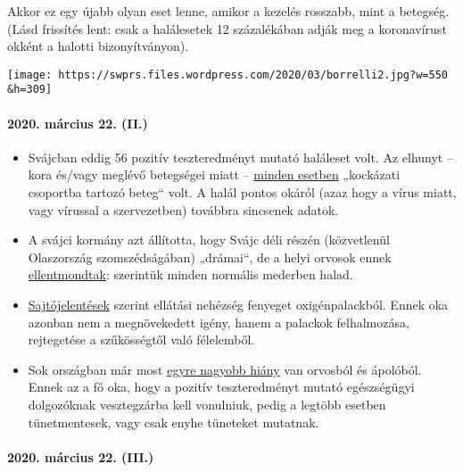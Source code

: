 Akkor ez egy újabb olyan eset lenne, amikor a kezelés rosszabb, mint a
betegség. (Lásd frissítés lent: csak a halálesetek 12 százalékában adják
meg a koronavírust okként a halotti bizonyítványon).

\texttt{[image: https://swprs.files.wordpress.com/2020/03/borrelli2.jpg?w=550\\\&h=309]}

\hypertarget{2020-muxe1rcius-22-ii}{%
\paragraph{2020. március 22. (II.)}\label{2020-muxe1rcius-22-ii}}

\begin{itemize}
\tightlist
\item
  Svájcban eddig 56 pozitív teszteredményt mutató haláleset volt. Az
  elhunyt -- kora és/vagy meglévő betegségei miatt --
  \href{https://www.nzz.ch/schweiz/coronavirus-in-der-schweiz-die-neusten-entwicklungen-ld.1542664\#subtitle-wie-viele-infizierte-und-todesf-lle-gibt-es-second}{minden
  esetben} „kockázati csoportba tartozó beteg`` volt. A halál pontos
  okáról (azaz hogy a vírus miatt, vagy vírussal a szervezetben)
  továbbra sincsenek adatok.
\item
  A svájci kormány azt állította, hogy Svájc déli részén (közvetlenül
  Olaszország szomszédságában) „drámai``, de a helyi orvosok ennek
  \href{https://www.nzz.ch/schweiz/punkto-intensivbetten-sind-wir-im-tessin-besser-ausgeruestet-als-der-rest-der-schweiz-ld.1547728}{ellentmondtak}:
  szerintük minden normális mederben halad.
\item
  \href{https://www.blick.ch/news/schweiz/nicht-nur-beatmungsgeraete-werden-knapp-im-kampf-gegen-corona-es-droht-ein-engpass-beim-sauerstoff-id15808185.html}{Sajtójelentések}
  szerint ellátási nehézség fenyeget oxigénpalackból. Ennek oka azonban
  nem a megnövekedett igény, hanem a palackok felhalmozása, rejtegetése
  a szűkösségtől való félelemből.
\item
  Sok országban már most
  \href{https://www.washingtonpost.com/health/covid-19-hits-doctors-nurses-emts-threatening-health-system/2020/03/17/f21147e8-67aa-11ea-b313-df458622c2cc_story.html}{egyre
  nagyobb hiány} van orvosból és ápolóból. Ennek az a fő oka, hogy a
  pozitív teszteredményt mutató egészségügyi dolgozóknak vesztegzárba
  kell vonulniuk, pedig a legtöbb esetben tünetmentesek, vagy csak enyhe
  tüneteket mutatnak.
\end{itemize}

\hypertarget{2020-muxe1rcius-22-iii}{%
\paragraph{2020. március 22. (III.)}\label{2020-muxe1rcius-22-iii}}

